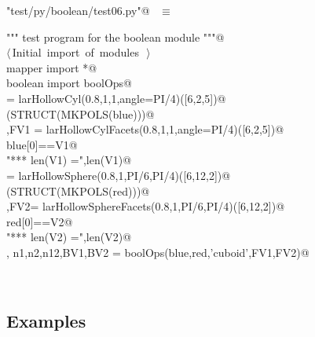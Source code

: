 \documentclass[11pt,oneside]{article}	%
\begin{document}
\begin{flushleft} \small
\begin{minipage}{\linewidth} \label{scrap25}
\verb@"test/py/boolean/test06.py"@\nobreak\ {\footnotesize {} }$\equiv$
\vspace{-1ex}
\begin{list}{}{} \item
\mbox{}\verb@""" test program for the boolean module """@\\
\mbox{}\verb@@\hbox{$\langle\,$Initial import of modules\nobreak\ {\footnotesize {}}$\,\rangle$}\verb@@\\
\mbox{}\verb@from mapper import *@\\
\mbox{}\verb@from boolean import boolOps@\\
\mbox{}\verb@blue = larHollowCyl(0.8,1,1,angle=PI/4)([6,2,5])@\\
\mbox{}\verb@VIEW(STRUCT(MKPOLS(blue)))@\\
\mbox{},FV1 = larHollowCylFacets(0.8,1,1,angle=PI/4)([6,2,5])@\\
\mbox{}\verb@assert blue[0]==V1@\\
\mbox{}\verb@print "*** len(V1) =",len(V1)@\\
\mbox{}\verb@red = larHollowSphere(0.8,1,PI/6,PI/4)([6,12,2])@\\
\mbox{}\verb@VIEW(STRUCT(MKPOLS(red)))@\\
\mbox{},FV2= larHollowSphereFacets(0.8,1,PI/6,PI/4)([6,12,2])@\\
\mbox{}\verb@assert red[0]==V2@\\
\mbox{}\verb@print "*** len(V2) =",len(V2)@\\
\mbox{}\verb@V, n1,n2,n12,BV1,BV2 = boolOps(blue,red,'cuboid',FV1,FV2)@\\
\mbox{}\verb@@{\NWsep}
\end{list}
\vspace{-2ex}
\end{minipage}\\[4ex]
\end{flushleft}

\subsection{Examples}
\appendix
\end{document}
